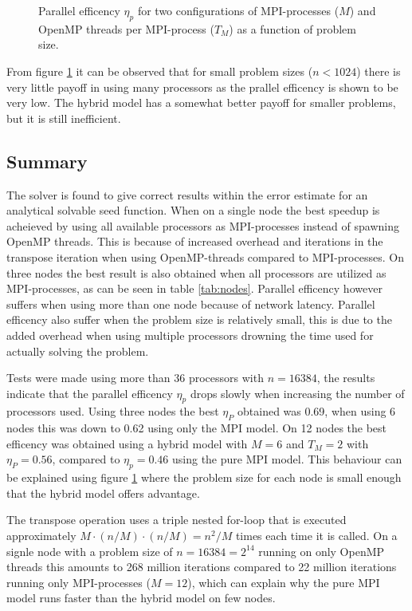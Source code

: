 \documentclass[11pt,a4paper,english]{article}
\numberwithin{figure}{subsection}
\numberwithin{table}{subsection}
\begin{document}
\begin{figure}[htbp]
	\centering
	
	\label{fig:peff}
	\caption{Parallel efficency $\eta_p$ for two configurations of MPI-processes ($M$) and OpenMP threads per MPI-process ($T_M$) as a function of problem size.}
\end{figure}

From figure \ref{fig:peff} it can be observed that for small problem sizes ($n<1024$) there is very little payoff in using many processors as the prallel efficency is shown to be very low. The hybrid model has a somewhat better payoff for smaller problems, but it is still inefficient.

\subsection{Summary}
The solver is found to give correct results within the error estimate for an analytical solvable seed function. When on a single node the best speedup is acheieved by using all available processors as MPI-processes instead of spawning OpenMP threads. This is because of increased overhead and iterations in the transpose iteration when using OpenMP-threads compared to MPI-processes. On three nodes the best result is also obtained when all processors are utilized as MPI-processes, as can be seen in table \ref{tab:nodes}. Parallel efficency however suffers when using more than one node because of network latency. Parallel efficency also suffer when the problem size is relatively small, this is due to the added overhead when using multiple processors drowning the time used for actually solving the problem.

Tests were made using more than 36 processors with $n=16384$, the results indicate that the parallel efficency $\eta_p$ drops slowly when increasing the number of processors used. Using three nodes the best $\eta_P$ obtained was 0.69, when using 6 nodes this was down to 0.62 using only the MPI model. On 12 nodes the best efficency was obtained using a hybrid model with $M=6$ and $T_M=2$ with $\eta_P=0.56$, compared to $\eta_p=0.46$ using the pure MPI model. This behaviour can be explained using figure \ref{fig:peff} where the problem size for each node is small enough that the hybrid model offers advantage.

The transpose operation uses a triple nested for-loop that is executed approximately $M\cdot (n/M)\cdot(n/M) = n^2/M$ times each time it is called. On a signle node with a problem size of $n=16384=2^{14}$ running on only OpenMP threads this amounts to 268 million iterations compared to 22 million iterations running only MPI-processes ($M=12$), which can explain why the pure MPI model runs faster than the hybrid model on few nodes.
\end{document}
